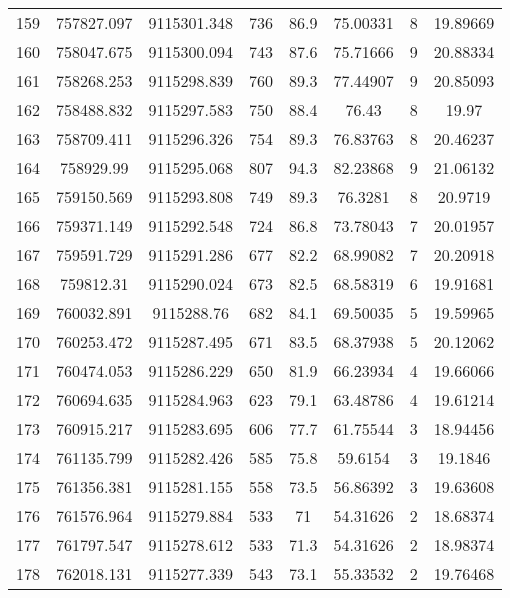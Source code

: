 \begin{longtable}{cccccccc}
159  & 757827.097      & 9115301.348      & 736     & 86.9  & 75.00331 & 8  & 19.89669 \\
160  & 758047.675      & 9115300.094      & 743     & 87.6  & 75.71666 & 9  & 20.88334 \\
161  & 758268.253      & 9115298.839      & 760     & 89.3  & 77.44907 & 9  & 20.85093 \\
162  & 758488.832      & 9115297.583      & 750     & 88.4  & 76.43    & 8  & 19.97    \\
163  & 758709.411      & 9115296.326      & 754     & 89.3  & 76.83763 & 8  & 20.46237 \\
164  & 758929.99       & 9115295.068      & 807     & 94.3  & 82.23868 & 9  & 21.06132 \\
165  & 759150.569      & 9115293.808      & 749     & 89.3  & 76.3281  & 8  & 20.9719  \\
166  & 759371.149      & 9115292.548      & 724     & 86.8  & 73.78043 & 7  & 20.01957 \\
167  & 759591.729      & 9115291.286      & 677     & 82.2  & 68.99082 & 7  & 20.20918 \\
168  & 759812.31       & 9115290.024      & 673     & 82.5  & 68.58319 & 6  & 19.91681 \\
169  & 760032.891      & 9115288.76       & 682     & 84.1  & 69.50035 & 5  & 19.59965 \\
170  & 760253.472      & 9115287.495      & 671     & 83.5  & 68.37938 & 5  & 20.12062 \\
171  & 760474.053      & 9115286.229      & 650     & 81.9  & 66.23934 & 4  & 19.66066 \\
172  & 760694.635      & 9115284.963      & 623     & 79.1  & 63.48786 & 4  & 19.61214 \\
173  & 760915.217      & 9115283.695      & 606     & 77.7  & 61.75544 & 3  & 18.94456 \\
174  & 761135.799      & 9115282.426      & 585     & 75.8  & 59.6154  & 3  & 19.1846  \\
175  & 761356.381      & 9115281.155      & 558     & 73.5  & 56.86392 & 3  & 19.63608 \\
176  & 761576.964      & 9115279.884      & 533     & 71    & 54.31626 & 2  & 18.68374 \\
177  & 761797.547      & 9115278.612      & 533     & 71.3  & 54.31626 & 2  & 18.98374 \\
178  & 762018.131      & 9115277.339      & 543     & 73.1  & 55.33532 & 2  & 19.76468 \\

\end{longtable}
